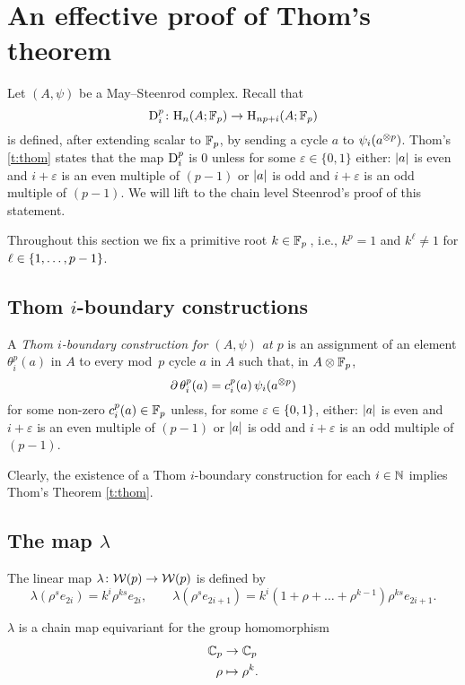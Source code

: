 
\appendix
\section{An effective proof of Thom's theorem}\label{s:thom}

\noindent Let $(A,\psi)$ be a May--Steenrod complex.
Recall that
\[
\mathrm{D}_i^p \colon \mathrm{H}_n(A; {\mathbb{F}_p}) \to \mathrm{H}_{np+i}(A; {\mathbb{F}_p})
\]
is defined, after extending scalar to ${\mathbb{F}_p}$, by sending a cycle $a$ to $\psi_i(a^{\otimes p})$.
Thom's \cref{t:thom} states that the map $\mathrm{D}_i^p$ is $0$ unless for some $\varepsilon \in \{0,1\}$ either: $\lvert a\rvert$ is even and $i+\varepsilon$ is an even multiple of $(p-1)$ or $\lvert a\rvert$ is odd and $i+\varepsilon$ is an odd multiple of $(p-1)$.
We will lift to the chain level Steenrod's proof of this statement.

Throughout this section we fix a primitive root $k \in {\mathbb{F}_p}$\,, i.e., $k^p = 1$ and $k^\ell \neq 1$ for $\ell \in \{1,\dots,p-1\}$.

\subsection{Thom $i$-boundary constructions}

A \textit{Thom $i$-boundary construction for $(A,\psi)$ at $p$} is an assignment of an element $\theta_i^p(a)$ in $A$ to every mod~$p$ cycle $a$ in $A$ such that, in $A \otimes {\mathbb{F}_p}$,
\[
\operatorname{\partial} \theta_i^p(a) = c_i^p(a) \, \psi_i(a^{\otimes p})
\]
for some non-zero $c_i^p(a) \in {\mathbb{F}_p}$ unless, for some $\varepsilon \in \{0,1\}$, either: $\lvert a\rvert$ is even and $i+\varepsilon$ is an even multiple of $(p-1)$ or $\lvert a\rvert$ is odd and $i+\varepsilon$ is an odd multiple of $(p-1)$.

Clearly, the existence of a Thom $i$-boundary construction for each $i \in \mathbb{N}$ implies Thom's Theorem \cref{t:thom}.

\subsection{The map $\lambda$}

The linear map $\lambda \colon \mathcal{W}(p) \to \mathcal{W}(p)$ is defined by
\[
\lambda(\rho^s e_{2i}) = k^i \rho^{ks} e_{2i}, \qquad
\lambda(\rho^s e_{2i+1}) = k^i (1+\rho+\dots+\rho^{k-1}) \rho^{ks} e_{2i+1}.
\]

\begin{lemma}
	$\lambda$ is a chain map equivariant for the group homomorphism
	\begin{align*}
		\mathbb{C}_p &\to \mathbb{C}_p \\
		\rho &\mapsto \rho^k.
	\end{align*}
\end{lemma}

